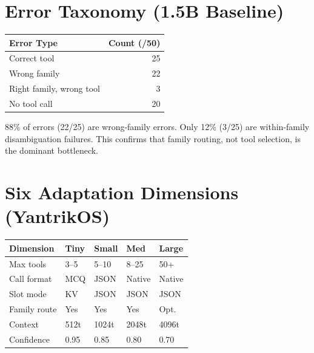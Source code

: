 \documentclass[11pt]{article}
\begin{document}
\appendix

\section{Error Taxonomy (1.5B Baseline)}

\begin{table}[h]
\centering
\small
\begin{tabular}{@{}lr@{}}
\toprule
Error Type & Count (/50) \\
\midrule
Correct tool & 25 \\
Wrong family & 22 \\
Right family, wrong tool & 3 \\
No tool call & 20 \\
\bottomrule
\end{tabular}
\end{table}

88\% of errors (22/25) are wrong-family errors. Only 12\% (3/25) are within-family disambiguation failures. This confirms that family routing, not tool selection, is the dominant bottleneck.

\section{Six Adaptation Dimensions (YantrikOS)}

\begin{table}[h]
\centering
\small
\begin{tabular}{@{}lllll@{}}
\toprule
Dimension & Tiny & Small & Med & Large \\
\midrule
Max tools & 3--5 & 5--10 & 8--25 & 50+ \\
Call format & MCQ & JSON & Native & Native \\
Slot mode & KV & JSON & JSON & JSON \\
Family route & Yes & Yes & Yes & Opt. \\
Context & 512t & 1024t & 2048t & 4096t \\
Confidence & 0.95 & 0.85 & 0.80 & 0.70 \\
\bottomrule
\end{tabular}
\end{table}
\end{document}

